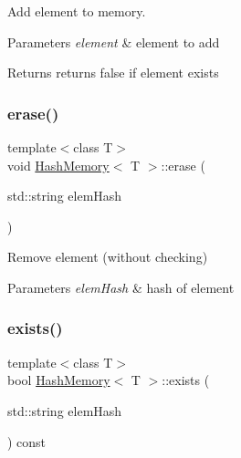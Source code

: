Add element to memory. 


\begin{DoxyParams}{Parameters}
{\em element} & element to add \\
\hline
\end{DoxyParams}
\begin{DoxyReturn}{Returns}
returns false if element exists 
\end{DoxyReturn}
\mbox{\label{classHashMemory_a96bcc6b0bf9ae5999ca29bb61a3eff0c}} 
\subsubsection{\texorpdfstring{erase()}{erase()}}
{\footnotesize\ttfamily template$<$class T$>$ \\
void \mbox{\hyperlink{classHashMemory}{Hash\+Memory}}$<$ T $>$\+::erase (\begin{DoxyParamCaption}\item[{std\+::string}]{elem\+Hash }\end{DoxyParamCaption})\hspace{0.3cm}{\ttfamily [inline]}}



Remove element (without checking) 


\begin{DoxyParams}{Parameters}
{\em elem\+Hash} & hash of element \\
\hline
\end{DoxyParams}
\mbox{\label{classHashMemory_ac9bd6270bbfa924ce5f27fada28afe9f}} 
\subsubsection{\texorpdfstring{exists()}{exists()}\hspace{0.1cm}{\footnotesize\ttfamily [1/2]}}
{\footnotesize\ttfamily template$<$class T$>$ \\
bool \mbox{\hyperlink{classHashMemory}{Hash\+Memory}}$<$ T $>$\+::exists (\begin{DoxyParamCaption}\item[{std\+::string}]{elem\+Hash }\end{DoxyParamCaption}) const\hspace{0.3cm}{\ttfamily [inline]}}



